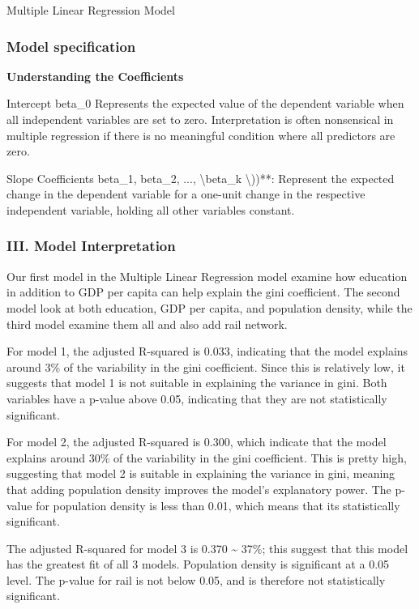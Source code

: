 \documentclass[
  a4paper,
  DIV=11,
  numbers=noendperiod]{scrartcl}
\begin{document}
Multiple Linear Regression Model

\hypertarget{model-specification}{%
\subsubsection{Model specification}\label{model-specification}}

\textbf{Understanding the Coefficients}

Intercept beta\_0 Represents the expected value of the dependent
variable when all independent variables are set to zero. Interpretation
is often nonsensical in multiple regression if there is no meaningful
condition where all predictors are zero.

Slope Coefficients beta\_1, beta\_2, ..., \textbackslash beta\_k
\textbackslash))**: Represent the expected change in the dependent
variable for a one-unit change in the respective independent variable,
holding all other variables constant.

\hypertarget{iii.-model-interpretation}{%
\subsubsection{III. Model
Interpretation}\label{iii.-model-interpretation}}

Our first model in the Multiple Linear Regression model examine how
education in addition to GDP per capita can help explain the gini
coefficient. The second model look at both education, GDP per capita,
and population density, while the third model examine them all and also
add rail network.

For model 1, the adjusted R-squared is 0.033, indicating that the model
explains around 3\% of the variability in the gini coefficient. Since
this is relatively low, it suggests that model 1 is not suitable in
explaining the variance in gini. Both variables have a p-value above
0.05, indicating that they are not statistically significant.

For model 2, the adjusted R-squared is 0.300, which indicate that the
model explains around 30\% of the variability in the gini coefficient.
This is pretty high, suggesting that model 2 is suitable in explaining
the variance in gini, meaning that adding population density improves
the model's explanatory power. The p-value for population density is
less than 0.01, which means that its statistically significant.

The adjusted R-squared for model 3 is 0.370 \textasciitilde{} 37\%; this
suggest that this model has the greatest fit of all 3 models. Population
density is significant at a 0.05 level. The p-value for rail is not
below 0.05, and is therefore not statistically significant.
\end{document}
